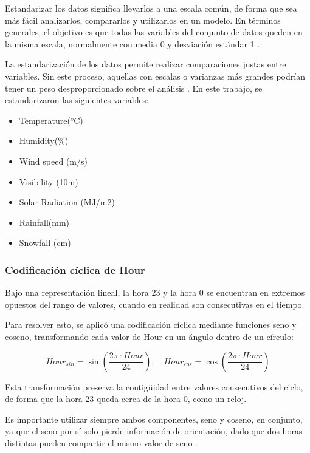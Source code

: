 \documentclass[10pt,journal,compsoc]{IEEEtran}
\begin{document}
Estandarizar los datos significa llevarlos a una escala común, de forma que sea más fácil analizarlos, compararlos y utilizarlos en un modelo. En términos generales, el objetivo es que todas las variables del conjunto de datos queden en la misma escala, normalmente con media 0 y desviación estándar 1 \cite{standa}.

La estandarización de los datos permite realizar comparaciones justas entre variables. Sin este proceso, aquellas con escalas o varianzas más grandes podrían tener un peso desproporcionado sobre el análisis \cite{standa}. En este trabajo, se estandarizaron las siguientes variables:

\begin{itemize}
\item Temperature(°C)
\item Humidity(\%)
\item Wind speed (m/s)
\item Visibility (10m)
\item Solar Radiation (MJ/m2)
\item Rainfall(mm)
\item Snowfall (cm)
\end{itemize}

\subsubsection{Codificación cíclica de Hour}
Bajo una representación lineal, la hora 23 y la hora 0 se encuentran en extremos opuestos del rango de valores, cuando en realidad son consecutivas en el tiempo. 

Para resolver esto, se aplicó una codificación cíclica mediante funciones seno y coseno, transformando cada valor de Hour en un ángulo dentro de un círculo:

\begin{equation}
Hour_{sin} = \sin\left(\frac{2\pi \cdot Hour}{24}\right), \quad Hour_{cos} = \cos\left(\frac{2\pi \cdot Hour}{24}\right)
\label{eq:cyclic}
\end{equation}

Esta transformación preserva la contigüidad entre valores consecutivos del ciclo, de forma que la hora 23 queda cerca de la hora 0, como un reloj. 

Es importante utilizar siempre ambos componentes, seno y coseno, en conjunto, ya que el seno por sí solo pierde información de orientación, dado que dos horas distintas pueden compartir el mismo valor de seno \cite{cyclic}. 
\end{document}
